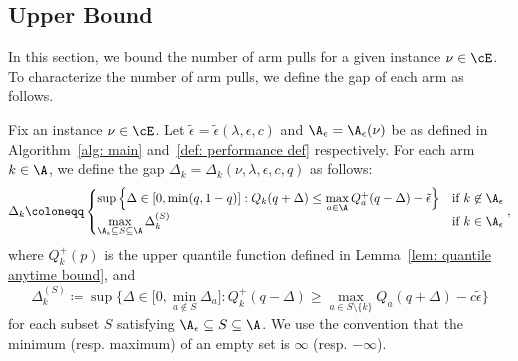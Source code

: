 \subsection{Upper Bound}
\label{sec: upper bound}
In this section, we bound the number of arm pulls for a given instance $\nu \in \cE$. To characterize the number of arm pulls, we define the gap of each arm as follows.
\begin{definition}
\label{def: our gap}
     Fix an instance $\nu \in \cE$.
     Let $\tilde{\epsilon} = \tilde{\epsilon}(\lambda, \epsilon, c)$ and $\A_{\epsilon} = \A_{\epsilon}(\nu)$ be as defined in Algorithm~\ref{alg: main} and~\eqref{def: performance def} respectively.
    For each arm $k \in \A$, we define the gap  $\Delta_{k} =
    \Delta_{k}(\nu, \lambda, \epsilon, c, q)$ as follows:
\begin{equation}
    \label{eq: our gap}
    \Delta_{k}
    \coloneqq
    \begin{cases}
    \sup
    \Big\{
        \Delta \in \left[0, \min(q, 1-q) \right]
        :
        Q_k(q + \Delta) 
        \le
        \max\limits_{a \in \A  }
        Q^+_{a}(q - \Delta) - \tilde{\epsilon}
        \Big\}
    & \text{if }  k \not\in \A_{\epsilon} \\
   \max\limits_{\A_{\epsilon} \subseteq S \subseteq \A}
        \Delta_{k}^{(S)}
    & \text{if } k \in \A_{\epsilon} 
    \end{cases},
\end{equation}
where $Q^+_k(p)$ is the upper quantile function defined in Lemma~\ref{lem: quantile anytime bound},  
and
\begin{equation}
\label{eq: Delta k^S}
    \Delta_{k}^{(S)} \coloneqq
   \sup
    \Big\{
        \Delta \in 
       \Big[0, \min_{a \not\in S} \Delta_{a}  \Big]
        :
        Q^+_k(q - \Delta) 
        \ge 
        \max\limits_{ a \in S \setminus \{k\}} 
        Q_{a}(q + \Delta) - c \tilde{\epsilon}
        \Big\}
\end{equation}
for each subset $S$ satisfying $\A_{\epsilon} \subseteq S \subseteq \A$. We use the convention that the minimum (resp. maximum) of an empty set is $\infty$ (resp. $- \infty$).
\end{definition}

